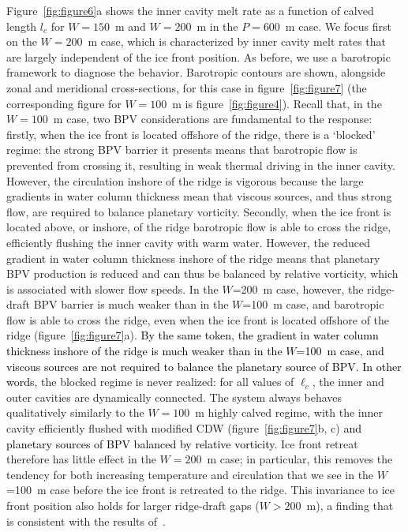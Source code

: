 \documentclass[draft]{agujournal2019}
\newcommand{\rout}[1]{\red{\st{#1}}}\newcommand{\ab}[1]{\textcolor{Green}{#1}}\newcommand{\about}[1]{\textcolor{Cyan}{\sout{#1}}}
\newcommand{\blue}[1]{\textcolor{blue}{#1}}
\newcommand{\red}[1]{\textcolor{red}{#1}}
\renewcommand{\rout}[1]{{}} %
\renewcommand{\blue}[1]{{\textcolor{black}{#1}}} %
\renewcommand{\red}[1]{{}} %
\begin{document}
Figure~\ref{fig:figure6}a shows the inner cavity melt rate as a function of calved length $l_c$ for $W=150$~m and $W=200$~m in the $P = 600$~m case. We focus first on the $W = 200$~m case, which is characterized by inner cavity melt rates that are largely independent of the ice front position. As before, we use a barotropic framework to diagnose the behavior. Barotropic contours are shown, alongside zonal and meridional cross-sections, for this case in  figure~\ref{fig:figure7} (the corresponding figure for $W = 100$~m is figure~\ref{fig:figure4}). Recall that, in the $W=100$~m case, two BPV considerations are fundamental to the response: firstly, when the ice front is located offshore of the ridge, there is a `blocked' regime: the strong BPV barrier it presents means that barotropic flow is prevented from crossing it, resulting in weak thermal driving in the inner cavity. However, the circulation inshore of the ridge is vigorous because the large gradients in water column thickness mean that viscous sources, and thus strong flow, are required to balance planetary vorticity. Secondly, when the ice front is located above, or inshore, of the ridge barotropic flow is able to cross the ridge, efficiently flushing the inner cavity with warm water. However, the reduced gradient in water column thickness inshore of the ridge means that planetary BPV production is reduced and can thus be balanced by relative vorticity, which is associated with slower flow speeds. \rout{(1) when the ice front is offshore of the ridge, the ridge-draft BPV barrier largely restricts barotropic flow into the cavity and inner cavity flushing is weak, but (2) ice front induced vorticity and the relaxation of this PV barrier as the ice front is retreated to the ridge, and beyond, permits barotropic flow across the ridge that efficiently flushes the inner cavity with warm water, but the associated increase in thermal driving is outweighed by a reduction in the inner cavity circulation.} In the $W$=200~m case, however, the ridge-draft BPV barrier is much weaker than in the $W$=100~m case, and barotropic flow is able to cross the ridge, even when the ice front is located offshore of the ridge (figure~\ref{fig:figure7}a). \blue{By the same token, the gradient in water column thickness inshore of the ridge is much weaker than in the $W$=100~m case, and viscous sources are not required to balance the planetary source of BPV. In other words, } the blocked regime is never realized: for all values of $\ell_c$, the inner and outer cavities are dynamically connected. The system always behaves qualitatively similarly to the $W = 100$~m highly calved regime, with the inner cavity efficiently flushed with modified CDW (figure~\ref{fig:figure7}b, c) \blue{and planetary sources of BPV balanced by relative vorticity}. Ice front retreat therefore has little effect in the $W = 200$~m case; in particular, this removes the tendency for both increasing temperature and circulation that we see in the $W$=100~m case before the ice front is retreated to the ridge. This invariance to ice front position also holds for larger ridge-draft gaps ($W>200$~m), a finding that is consistent with the results of~.
\end{document}

